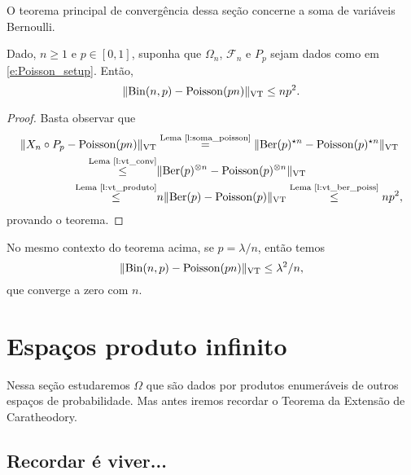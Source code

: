 \begin{topics}
O teorema principal de convergência dessa seção concerne a soma de variáveis Bernoulli.

\begin{theorem}
  \label{t:lei_peq_numeros}
  Dado, $n \geq 1$ e $p \in [0,1]$, suponha que $\Omega_n$, $\mathcal{F}_n$ e $P_p$ sejam dados como em \eqref{e:Poisson_setup}.
  Então,
  \begin{equation}
    \lVert \operatorname{Bin}(n,p) - \operatorname{Poisson}(pn) \rVert_{\operatorname{VT}} \leq n p^2.
  \end{equation}
\end{theorem}

\begin{proof}
  Basta observar que
  \begin{equation}
    \begin{split}
      \lVert X_n \circ P_p - \operatorname{Poisson}(pn) \rVert_{\operatorname{VT}} & \overset{\text{Lema~\ref{l:soma_poisson}}}= \lVert \operatorname{Ber}(p)^{\star n} - \operatorname{Poisson}(p)^{\star n} \rVert_{\operatorname{VT}}\\
      \overset{\text{Lema~\ref{l:vt_conv}}}\leq & \lVert \operatorname{Ber}(p)^{\otimes n} - \operatorname{Poisson}(p)^{\otimes n} \rVert_{\operatorname{VT}}\\
      \overset{\text{Lema~\ref{l:vt_produto}}}\leq & n \lVert \operatorname{Ber}(p) - \operatorname{Poisson}(p) \rVert_{\operatorname{VT}} \overset{\text{Lema~\ref{l:vt_ber_poiss}}}\leq n p^2,
    \end{split}
  \end{equation}
  provando o teorema.
\end{proof}

\begin{corollary}
  No mesmo contexto do teorema acima, se $p = \lambda/n$, então temos
  \begin{equation}
    \lVert \operatorname{Bin}(n,p) - \operatorname{Poisson}(pn) \rVert_{\operatorname{VT}} \leq \lambda^2 / n,
  \end{equation}
  que converge a zero com $n$.
\end{corollary}

\end{topics}

\section{Espaços produto infinito}
\label{s:Omega_produto}

Nessa seção estudaremos $\Omega$ que são dados por produtos enumeráveis de outros espaços de probabilidade.
Mas antes iremos recordar o Teorema da Extensão de Caratheodory.

\subsection{Recordar é viver...}


